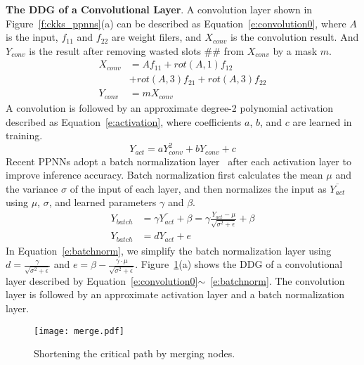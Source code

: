 \documentclass{article}
\begin{document}
    
\textbf{The DDG of a Convolutional Layer}. A convolution layer shown in Figure~\ref{f:ckks_ppnns}(a) can be described as Equation~\ref{e:convolution0}, where $A$ is the input, $f_{11}$ and $f_{22}$ are weight filers, and $X_{conv}$ is the convolution result. And $Y_{conv}$ is the result after removing wasted slots $\#\#$ from $X_{conv}$ by a mask $m$.   
\begin{equation}
\begin{split}
X_{conv} & = A f_{11} + rot(A,1) f_{12} \\
         & + rot(A,3) f_{21} + rot(A,3) f_{22}\\
Y_{conv} & = m X_{conv}
\label{e:convolution0}
\end{split}
\end{equation}	
A convolution is followed by an approximate degree-2 polynomial activation described as Equation~\ref{e:activation}, where coefficients $a$, $b$, and $c$ are learned in training. 
\begin{equation}
\label{e:activation}
Y_{act} = a Y_{conv}^2 + b Y_{conv} +c
\end{equation} 
Recent PPNNs adopt a batch normalization layer~\cite{Ioffe:ICML'15batchnorm} after each activation layer to improve inference accuracy. Batch normalization first calculates the mean $\mu$ and the variance $\sigma$ of the input of each layer, and then normalizes the input as $\overline{Y_{act}}$ using $\mu$, $\sigma$, and learned parameters $\gamma$ and $\beta$. 
\begin{equation}
\begin{split}
\label{e:batchnorm}
Y_{batch} & = \gamma \overline{Y_{act}} +\beta = \gamma  \frac{Y_{act}-\mu}{\sqrt{\sigma^2+\epsilon}}+\beta \\
Y_{batch} & = d Y_{act} +e
\end{split}
\end{equation}
In Equation~\ref{e:batchnorm}, we simplify the batch normalization layer using $d=\frac{\gamma}{\sqrt{\sigma^2+\epsilon}}$ and $e=\beta - \frac{\gamma \cdot \mu}{\sqrt{\sigma^2+\epsilon}}$. Figure~\ref{f:method2}(a) shows the DDG of a convolutional layer described by Equation~\ref{e:convolution0}$\sim$~\ref{e:batchnorm}. The convolution layer is followed by an approximate activation layer and a batch normalization layer.  

    
	
\begin{figure}[t!]
		\centering
		\texttt{[image: merge.pdf]}
		\vspace{-0.3in}
		\caption{Shortening the critical path by merging nodes.}
		\label{f:method2}
\end{figure}
\end{document}
